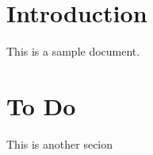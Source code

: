 \documentclass{../lib/lib-en}
\begin{document}

\newpage


\section{Introduction}
This is a sample document.
\section{To Do}
This is another secion

\newpage



\newpage

\end{document}
